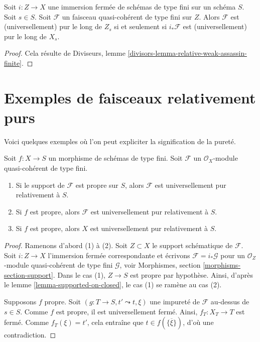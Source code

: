 \begin{lemma}
\label{lemma-supported-on-closed}
Soit $i : Z \to X$ une immersion fermée de schémas de type fini sur
un schéma $S$. Soit $s \in S$. Soit $\mathcal{F}$ un
faisceau quasi-cohérent de type fini sur $Z$. Alors $\mathcal{F}$ est
(universellement) pur le long de $Z_s$ si et seulement si $i_*\mathcal{F}$
est (universellement) pur le long de $X_s$.
\end{lemma}

\begin{proof}
Cela résulte de
Diviseurs, lemme \ref{divisors-lemma-relative-weak-assassin-finite}.
\end{proof}








\section{Exemples de faisceaux relativement purs}
\label{section-examples-pure-sheaves}

\noindent
Voici quelques exemples où l'on peut expliciter la signification de la pureté.

\begin{lemma}
\label{lemma-proper-pure}
Soit $f : X \to S$ un morphisme de schémas de type fini.
Soit $\mathcal{F}$ un $\mathcal{O}_X$-module quasi-cohérent de type fini.
\begin{enumerate}
\item Si le support de $\mathcal{F}$ est propre sur $S$, alors
$\mathcal{F}$ est universellement pur relativement à $S$.
\item Si $f$ est propre, alors
$\mathcal{F}$ est universellement pur relativement à $S$.
\item Si $f$ est propre, alors $X$ est universellement pur relativement à $S$.
\end{enumerate}
\end{lemma}

\begin{proof}
Ramenons d'abord (1) à (2). Soit $Z \subset X$ le
support schématique de $\mathcal{F}$. Soit $i : Z \to X$
l'immersion fermée correspondante et écrivons
$\mathcal{F} = i_*\mathcal{G}$ pour un
$\mathcal{O}_Z$-module quasi-cohérent de type fini $\mathcal{G}$, voir
Morphismes, section \ref{morphisms-section-support}.
Dans le cas (1), $Z \to S$ est propre par hypothèse.
Ainsi, d'après le lemme \ref{lemma-supported-on-closed}, le cas (1) se ramène au cas (2).

\medskip\noindent
Supposons $f$ propre.
Soit $(g : T \to S, t' \leadsto t, \xi)$ une impureté de $\mathcal{F}$
au-dessus de $s \in S$. Comme $f$ est propre, il est universellement fermé. Ainsi,
$f_T : X_T \to T$ est fermé. Comme $f_T(\xi) = t'$, cela entraîne que
$t \in f(\overline{\{\xi\}})$, d'où une contradiction.
\end{proof}

